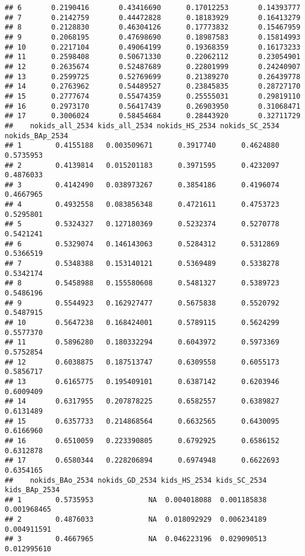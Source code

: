 \documentclass[
]{article}
\begin{document}
\begin{verbatim}
## 6       0.2190416       0.43416690      0.17012253       0.14393777
## 7       0.2142759       0.44472828      0.18183929       0.16413279
## 8       0.2128830       0.46304126      0.17773832       0.15467959
## 9       0.2068195       0.47698690      0.18987583       0.15814993
## 10      0.2217104       0.49064199      0.19368359       0.16173233
## 11      0.2598408       0.50671330      0.22062112       0.23054901
## 12      0.2635674       0.52487689      0.22801999       0.24240907
## 13      0.2599725       0.52769699      0.21389270       0.26439778
## 14      0.2763962       0.54489527      0.23845835       0.28727170
## 15      0.2777674       0.55474359      0.25555031       0.29819110
## 16      0.2973170       0.56417439      0.26903950       0.31068471
## 17      0.3006024       0.58454684      0.28443920       0.32711729
##    nokids_all_2534 kids_all_2534 nokids_HS_2534 nokids_SC_2534 nokids_BAp_2534
## 1        0.4155188   0.003509671      0.3917740      0.4624880       0.5735953
## 2        0.4139814   0.015201183      0.3971595      0.4232097       0.4876033
## 3        0.4142490   0.038973267      0.3854186      0.4196074       0.4667965
## 4        0.4932558   0.083856348      0.4721611      0.4753723       0.5295801
## 5        0.5324327   0.127180369      0.5232374      0.5270778       0.5421241
## 6        0.5329074   0.146143063      0.5284312      0.5312869       0.5366519
## 7        0.5348388   0.153140121      0.5369489      0.5338278       0.5342174
## 8        0.5458988   0.155580608      0.5481327      0.5389723       0.5486196
## 9        0.5544923   0.162927477      0.5675838      0.5520792       0.5487915
## 10       0.5647238   0.168424001      0.5789115      0.5624299       0.5577370
## 11       0.5896280   0.180332294      0.6043972      0.5973369       0.5752854
## 12       0.6038875   0.187513747      0.6309558      0.6055173       0.5856717
## 13       0.6165775   0.195409101      0.6387142      0.6203946       0.6009409
## 14       0.6317955   0.207878225      0.6582557      0.6389827       0.6131489
## 15       0.6357733   0.214868564      0.6632565      0.6430095       0.6166960
## 16       0.6510059   0.223390805      0.6792925      0.6586152       0.6312878
## 17       0.6580344   0.228206894      0.6974948      0.6622693       0.6354165
##    nokids_BAo_2534 nokids_GD_2534 kids_HS_2534 kids_SC_2534 kids_BAp_2534
## 1        0.5735953             NA  0.004018088  0.001185838   0.001968465
## 2        0.4876033             NA  0.018092929  0.006234189   0.004911591
## 3        0.4667965             NA  0.046223196  0.029090513   0.012995610

\end{verbatim}
\end{document}
